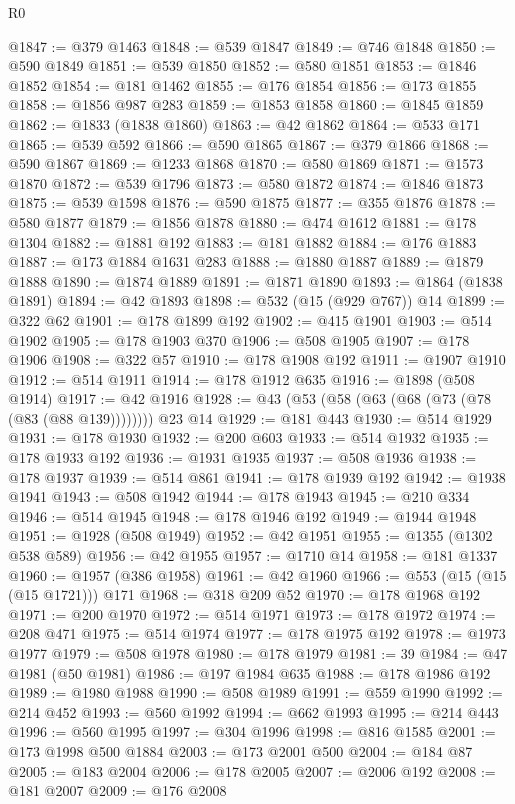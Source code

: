 \begin{lexlean}{R0}
\begin{coremodule}
@1847 := @379 @1463
@1848 := @539 @1847
@1849 := @746 @1848
@1850 := @590 @1849
@1851 := @539 @1850
@1852 := @580 @1851
@1853 := @1846 @1852
@1854 := @181 @1462
@1855 := @176 @1854
@1856 := @173 @1855
@1858 := @1856 @987 @283
@1859 := @1853 @1858
@1860 := @1845 @1859
@1862 := @1833 (@1838 @1860)
@1863 := @42 @1862
@1864 := @533 @171
@1865 := @539 @592
@1866 := @590 @1865
@1867 := @379 @1866
@1868 := @590 @1867
@1869 := @1233 @1868
@1870 := @580 @1869
@1871 := @1573 @1870
@1872 := @539 @1796
@1873 := @580 @1872
@1874 := @1846 @1873
@1875 := @539 @1598
@1876 := @590 @1875
@1877 := @355 @1876
@1878 := @580 @1877
@1879 := @1856 @1878
@1880 := @474 @1612
@1881 := @178 @1304
@1882 := @1881 @192
@1883 := @181 @1882
@1884 := @176 @1883
@1887 := @173 @1884 @1631 @283
@1888 := @1880 @1887
@1889 := @1879 @1888
@1890 := @1874 @1889
@1891 := @1871 @1890
@1893 := @1864 (@1838 @1891)
@1894 := @42 @1893
@1898 := @532 (@15 (@929 @767)) @14
@1899 := @322 @62
@1901 := @178 @1899 @192
@1902 := @415 @1901
@1903 := @514 @1902
@1905 := @178 @1903 @370
@1906 := @508 @1905
@1907 := @178 @1906
@1908 := @322 @57
@1910 := @178 @1908 @192
@1911 := @1907 @1910
@1912 := @514 @1911
@1914 := @178 @1912 @635
@1916 := @1898 (@508 @1914)
@1917 := @42 @1916
@1928 := @43 (@53 (@58 (@63 (@68 (@73 (@78 (@83 (@88 @139)))))))) @23 @14
@1929 := @181 @443
@1930 := @514 @1929
@1931 := @178 @1930
@1932 := @200 @603
@1933 := @514 @1932
@1935 := @178 @1933 @192
@1936 := @1931 @1935
@1937 := @508 @1936
@1938 := @178 @1937
@1939 := @514 @861
@1941 := @178 @1939 @192
@1942 := @1938 @1941
@1943 := @508 @1942
@1944 := @178 @1943
@1945 := @210 @334
@1946 := @514 @1945
@1948 := @178 @1946 @192
@1949 := @1944 @1948
@1951 := @1928 (@508 @1949)
@1952 := @42 @1951
@1955 := @1355 (@1302 @538 @589)
@1956 := @42 @1955
@1957 := @1710 @14
@1958 := @181 @1337
@1960 := @1957 (@386 @1958)
@1961 := @42 @1960
@1966 := @553 (@15 (@15 (@15 @1721))) @171
@1968 := @318 @209 @52
@1970 := @178 @1968 @192
@1971 := @200 @1970
@1972 := @514 @1971
@1973 := @178 @1972
@1974 := @208 @471
@1975 := @514 @1974
@1977 := @178 @1975 @192
@1978 := @1973 @1977
@1979 := @508 @1978
@1980 := @178 @1979
@1981 := 39
@1984 := @47 @1981 (@50 @1981)
@1986 := @197 @1984 @635
@1988 := @178 @1986 @192
@1989 := @1980 @1988
@1990 := @508 @1989
@1991 := @559 @1990
@1992 := @214 @452
@1993 := @560 @1992
@1994 := @662 @1993
@1995 := @214 @443
@1996 := @560 @1995
@1997 := @304 @1996
@1998 := @816 @1585
@2001 := @173 @1998 @500 @1884
@2003 := @173 @2001 @500
@2004 := @184 @87
@2005 := @183 @2004
@2006 := @178 @2005
@2007 := @2006 @192
@2008 := @181 @2007
@2009 := @176 @2008

\end{coremodule}
\end{lexlean}
